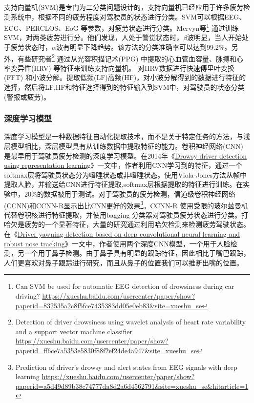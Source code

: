 支持向量机(SVM)是专门为二分类问题设计的，支持向量机已经应用于许多疲劳检测系统中，根据不同的疲劳程度对驾驶员的状态进行分类。SVM可以根据EEG、ECG、PERCLOS、EoG 等参数，对疲劳状态进行分类。Mervyn等\footnote{Can SVM be used for automatic EEG detection of drowsiness during car driving? \quad \url{https://xueshu.baidu.com/usercenter/paper/show?paperid=832535a2c8f5fce7435383dd05e0eb83&site=xueshu_se}} 通过训练SVM，对两类疲劳进行分。他们发现，人处于警觉状态时，$\beta$波明显，当人开始处于疲劳状态时，$\alpha$波有明显下降趋势。该方法的分类准确率可以达到99.2$\%$。另外，有些研究者\footnote{Detection of driver drowsiness using wavelet analysis of heart rate variability and a support vector machine classifier \quad \url{https://xueshu.baidu.com/usercenter/paper/show?paperid=ff6ce7a5353e5830f88f2ef24de4a947&site=xueshu_se}} 通过从光容积描记术(PPG) 中提取的心血管血容量、脉搏和心率变异性(HRV) 等特征来训练支持向量机。 对HRV数据进行快速傅里叶变换(FFT) 和小波分解。提取低频(LF)高频(HF)，对小波分解得到的数据进行特征的选择，然后将LF,HF和特征选择得到的特征输入到SVM中，对驾驶员的状态分类(警报或疲劳)。

\subsubsection{深度学习模型}

深度学习模型是一种数据特征自动化提取技术，而不是关于特定任务的方法，与浅层模型相比，深层模型具有从训练数据中提取特征的能力。卷积神经网络(CNN) 是最早用于驾驶员疲劳检测的深度学习模型。在2014年《\href{https://xueshu.baidu.com/usercenter/paper/show?paperid=a9b574549a36e94db6af2b728361eee9&site=xueshu_se&hitarticle=1}{Drowsy driver detection
using representation learning}》一文中，作者利用CNN学习到的特征，通过一个softmax层将驾驶员状态分为嗜睡状态或非嗜睡状态。使用Viola-Jones方法从帧中提取人脸，并输送给CNN进行特征提取,softmax层根据提取的特征进行训练。在实验中，20$\%$的数据被用于测试。对于驾驶员的疲劳检测，信道级卷积神经网络(CCNN)和CCNN-R显示出比CNN更好的效果\footnote{Prediction of driver's drowsy and alert states from EEG signals with deep learning \quad \url{https://xueshu.baidu.com/usercenter/paper/show?paperid=a5d49d89b38c74777da8d2a6d4562791&site=xueshu_se&hitarticle=1}}。CCNN-R 使用受限的玻尔兹曼机代替卷积核进行特征提取，并使用bagging 分类器对驾驶员疲劳状态进行分类。打哈欠是疲劳的一个显著特征，大量的研究通过利用哈欠检测来检测疲劳驾驶状态。在《\href{https://xueshu.baidu.com/usercenter/paper/show?paperid=1e648bec62633991942caf1104f4efbb&site=xueshu_se&hitarticle=1}{Driver yawning detection based on deep convolutional neural learning and robust nose tracking}》一文中，作者使用两个深度CNN模型，一个用于人脸检测，另一个用于鼻子检测。由于鼻子具有明显的跟踪特征，因此相比于嘴巴跟踪，人们更喜欢对鼻子跟踪进行研究，而且从鼻子的位置我们可以推断出嘴的位置。


